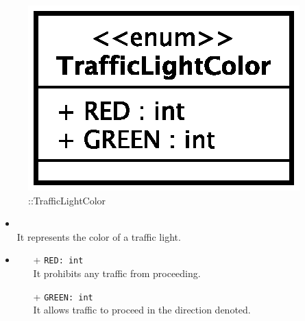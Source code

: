 \begin{figure}[h]
\centering
\includegraphics[scale=0.6,keepaspectratio]{images/solution/app/backend/traffic_light_color.eps}
\caption{\pReactiveComponentStretchDecoration::TrafficLightColor}
\label{fig:sd-app-traffic-light-color}
\end{figure}
\FloatBarrier
\begin{itemize}
  \item \textbf{\descr} \\
    It represents the color of a traffic light.
  \item \textbf{}
  \begin{itemize}
    \item[+] \texttt{RED: int} \\
    It prohibits any traffic from proceeding.
    \item[+] \texttt{GREEN: int} \\
	It allows traffic to proceed in the direction denoted.
  \end{itemize}
\end{itemize}
